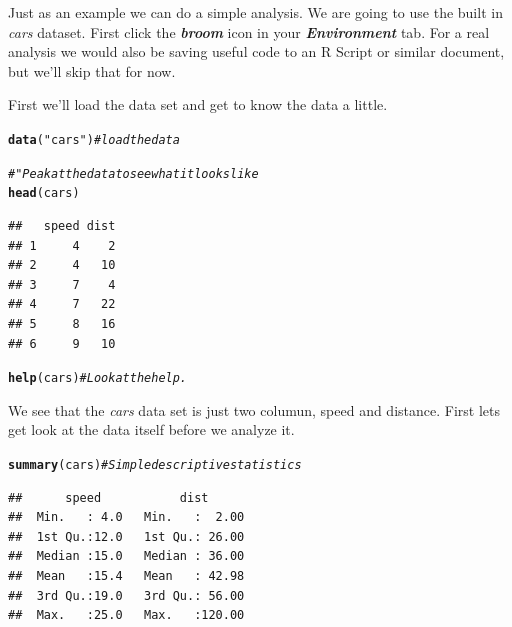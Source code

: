 \documentclass[draft]{article}\usepackage[]{graphicx}\usepackage[]{color}
\makeatletter
\newcommand{\hlstr}[1]{\textcolor[rgb]{0.192,0.494,0.8}{#1}}%
\newcommand{\hlcom}[1]{\textcolor[rgb]{0.678,0.584,0.686}{\textit{#1}}}%
\newcommand{\hlstd}[1]{\textcolor[rgb]{0.345,0.345,0.345}{#1}}%
\newcommand{\hlkwd}[1]{\textcolor[rgb]{0.737,0.353,0.396}{\textbf{#1}}}%
\newenvironment{kframe}{%
 \def\at@end@of@kframe{}%
 \ifinner\ifhmode%
  \def\at@end@of@kframe{\end{minipage}}%
  \begin{minipage}{\columnwidth}%
 \fi\fi%
 \def\FrameCommand##1{\hskip\@totalleftmargin \hskip-\fboxsep
 \colorbox{shadecolor}{##1}\hskip-\fboxsep
     \hskip-\linewidth \hskip-\@totalleftmargin \hskip\columnwidth}%
 \MakeFramed {\advance\hsize-\width
   \@totalleftmargin\z@ \linewidth\hsize
   \@setminipage}}%
 {\par\unskip\endMakeFramed%
 \at@end@of@kframe}
\newenvironment{knitrout}{}{} %
\makeatother
\begin{document}
  Just as an example we can do a simple analysis. We are going to use the built in \textit{cars} dataset. First click the \textbf{\textit{broom}} icon in your \textbf{\textit{Environment}} tab. For a real analysis we would also be saving useful code to an R Script or similar document, but we'll skip that for now.
  
  First we'll load the data set and get to know the data a little.
  
  
\begin{knitrout}
\color{fgcolor}\begin{kframe}
\begin{alltt}
  \hlkwd{data}\hlstd{(}\hlstr{"cars"}\hlstd{)}  \hlcom{# load the data }

  \hlcom{# "Peak at the data to see what it looks like}
  \hlkwd{head}\hlstd{(cars)}
\end{alltt}
\begin{verbatim}
##   speed dist
## 1     4    2
## 2     4   10
## 3     7    4
## 4     7   22
## 5     8   16
## 6     9   10
\end{verbatim}
\begin{alltt}
  \hlkwd{help}\hlstd{(cars)}  \hlcom{# Look at the help.}
\end{alltt}
\end{kframe}
\end{knitrout}
  
   We see that the \textit{cars} data set is just two columun, speed and distance. First lets get look at the data itself before we analyze it.
  
\begin{knitrout}
\color{fgcolor}\begin{kframe}
\begin{alltt}
    \hlkwd{summary}\hlstd{(cars)} \hlcom{# Simple descriptive statistics}
\end{alltt}
\begin{verbatim}
##      speed           dist       
##  Min.   : 4.0   Min.   :  2.00  
##  1st Qu.:12.0   1st Qu.: 26.00  
##  Median :15.0   Median : 36.00  
##  Mean   :15.4   Mean   : 42.98  
##  3rd Qu.:19.0   3rd Qu.: 56.00  
##  Max.   :25.0   Max.   :120.00
\end{verbatim}
\end{kframe}
\end{knitrout}
  
\end{document}
